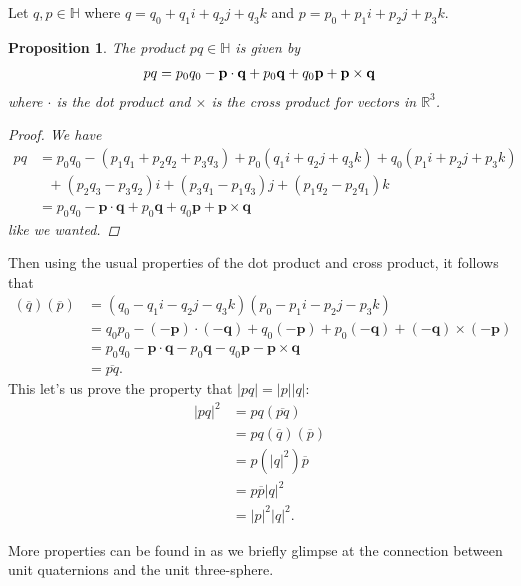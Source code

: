 \documentclass[12pt]{article}
\theoremstyle{plain}
\newtheorem{prop}[thm]{Proposition}
\theoremstyle{definition}
\begin{document}
Let $q,p\in\mathbb{H}$ where $q=q_0+q_1i+q_2j+q_3k$ and $p=p_0+p_1i+p_2j+p_3k$.
\begin{prop}\label{quatMultRule}
The product $pq \in \mathbb{H}$ is given by
\begin{align*}
    pq=p_0q_0-\textbf{\textup{p}}\cdot\textbf{\textup{q}}+p_0\textbf{\textup{q}}+q_0\textbf{\textup{p}}+\textbf{\textup{p}}\times\textbf{\textup{q}}
\end{align*}
where $\cdot$ is the \textit{dot product} and $\times$ is the \textit{cross product} for vectors in $\mathbb{R}^3$.
\begin{proof}
We have
\begin{align*}
    pq &= p_0q_0 - (p_1q_1+p_2q_2+p_3q_3)+p_0(q_1i+q_2j+q_3k)+q_0(p_1i+p_2j+p_3k) \\
    &\text{ }+(p_2q_3-p_3q_2)i+(p_3q_1-p_1q_3)j+(p_1q_2-p_2q_1)k \\
    &= p_0q_0-\textbf{p}\cdot\textbf{q}+p_0\textbf{q}+q_0\textbf{p}+\textbf{p}\times\textbf{q}
\end{align*}
like we wanted.
\end{proof}
\end{prop}

Then using the usual properties of the dot product and cross product, it follows that 
\begin{align*}
    (\overline{q})(\overline{p}) &= (q_0-q_1i-q_2j-q_3k)(p_0-p_1i-p_2j-p_3k) \\
        &= q_0p_0-(-\textbf{p})\cdot(-\textbf{q})+q_0(-\textbf{p})+p_0(-\textbf{q}) + (-\textbf{q})\times(-\textbf{p}) \\
        &= p_0q_0-\textbf{p}\cdot\textbf{q}-p_0\textbf{q}-q_0\textbf{p} - \textbf{p}\times\textbf{q} \\
        &= \overline{pq}.
\end{align*}
This let's us prove the property that $|pq|=|p||q|$:
\begin{align*}
    |pq|^2 &= pq(\overline{pq}) \\
        &= pq(\overline{q})(\overline{p}) \\
        &= p(|q|^2)\overline{p} \\
        &= p\overline{p}|q|^2 \\
        &= |p|^2|q|^2.
\end{align*}

More properties can be found in \cite{axler, hanson} as we briefly glimpse at the connection between unit quaternions and the unit three-sphere.
\end{document}
